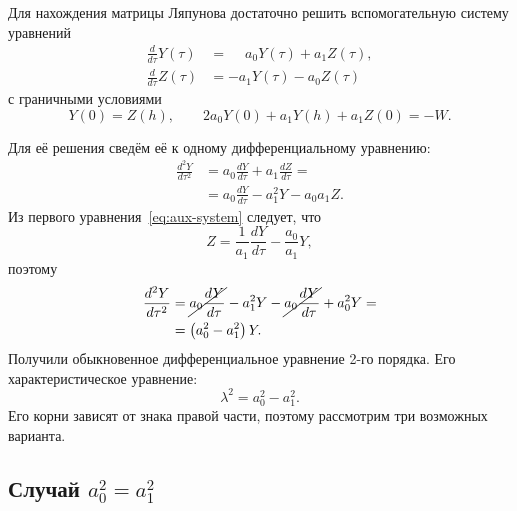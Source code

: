 \documentclass[a4paper,14pt]{article}
\theoremstyle{definition}
\begin{document}
Для нахождения матрицы Ляпунова достаточно решить вспомогательную систему уравнений
\begin{equation}
  \label{eq:aux-system}
  \begin{aligned}
    \frac{d }{d \tau} Y(\tau) &= \phantom{-}a_0 Y(\tau) + a_1 Z(\tau), \\
    \frac{d }{d \tau} Z(\tau) &= -a_1 Y(\tau) - a_0 Z(\tau)
  \end{aligned}
\end{equation}
с граничными условиями
\begin{equation}
  \label{eq:aux-boundaries}
  Y(0) = Z(h),
  \qquad
  2 a_0 Y(0) + a_1 Y(h) + a_1 Z(0) = -W.
\end{equation}

Для её решения сведём её к одному дифференциальному уравнению:
\begin{equation*}
  \begin{aligned}
    \frac{d^2 Y}{d \tau^2}
    &=
      a_0 \frac{d Y}{d \tau} + a_1 \frac{d Z}{d \tau} = \\
    &=
      a_0 \frac{d Y}{d \tau} - a_1^2 Y - a_0 a_1 Z.
  \end{aligned}
\end{equation*}
Из первого уравнения~\eqref{eq:aux-system} следует, что
\begin{equation*}
  Z = \frac{1}{a_1} \frac{d Y}{d \tau} - \frac{a_0}{a_1} Y,
\end{equation*}
поэтому
\begin{equation}
  \label{eq:aux-eq}
  \begin{aligned}
    \frac{d^2 Y}{d \tau^2}
    &= \cancel{a_0 \frac{d Y}{d \tau}} - a_1^2 Y
      - \cancel{a_0 \frac{d Y}{d \tau}} + a_0^2 Y = \\
    &= \left( a_0^2 - a_1^2 \right) Y.
  \end{aligned}
\end{equation}
Получили обыкновенное дифференциальное уравнение 2-го порядка. Его
характеристическое уравнение:
\begin{equation}
  \label{eq:aux-char}
  \lambda^2 = a_0^2 - a_1^2.
\end{equation}
Его корни зависят от знака правой части, поэтому рассмотрим три
возможных варианта.

\subsection{Случай $a_0^2 = a_1^2$}
\end{document}
